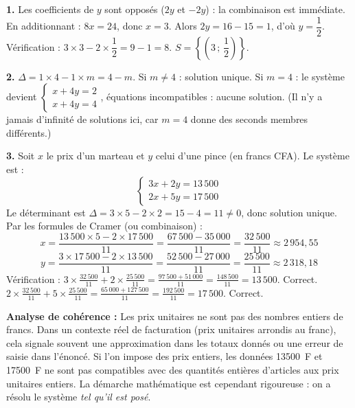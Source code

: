 \documentclass[11pt]{article}
\begin{document}
\begin{corrige}
\textbf{1.} Les coefficients de $y$ sont opposés ($2y$ et $-2y$) : la combinaison est immédiate. En additionnant : $8x = 24$, donc $x = 3$. Alors $2y = 16 - 15 = 1$, d'où $y = \dfrac{1}{2}$. Vérification : $3\times 3 - 2\times \dfrac{1}{2} = 9 - 1 = 8$. $S = \left\{\left(3\,;\,\dfrac{1}{2}\right)\right\}$.

\textbf{2.} $\Delta = 1\times 4 - 1\times m = 4 - m$. Si $m \neq 4$ : solution unique. Si $m = 4$ : le système devient $\begin{cases} x + 4y = 2 \\ x + 4y = 4 \end{cases}$, équations incompatibles : aucune solution. (Il n'y a jamais d'infinité de solutions ici, car $m = 4$ donne des seconds membres différents.)

\textbf{3.} Soit $x$ le prix d'un marteau et $y$ celui d'une pince (en francs CFA). Le système est :
\[ \begin{cases} 3x + 2y = 13\,500 \\ 2x + 5y = 17\,500 \end{cases} \]
Le déterminant est $\Delta = 3\times 5 - 2\times 2 = 15 - 4 = 11 \neq 0$, donc solution unique.
Par les formules de Cramer (ou combinaison) :
\[ x = \frac{13\,500 \times 5 - 2 \times 17\,500}{11} = \frac{67\,500 - 35\,000}{11} = \frac{32\,500}{11} \approx 2\,954,55 \]
\[ y = \frac{3 \times 17\,500 - 2 \times 13\,500}{11} = \frac{52\,500 - 27\,000}{11} = \frac{25\,500}{11} \approx 2\,318,18 \]
Vérification : $3\times \frac{32\,500}{11} + 2\times \frac{25\,500}{11} = \frac{97\,500 + 51\,000}{11} = \frac{148\,500}{11} = 13\,500$. Correct.
$2\times \frac{32\,500}{11} + 5\times \frac{25\,500}{11} = \frac{65\,000 + 127\,500}{11} = \frac{192\,500}{11} = 17\,500$. Correct.

\textbf{Analyse de cohérence :} Les prix unitaires ne sont pas des nombres entiers de francs. Dans un contexte réel de facturation (prix unitaires arrondis au franc), cela signale souvent une approximation dans les totaux donnés ou une erreur de saisie dans l'énoncé. Si l'on impose des prix entiers, les données \SI{13 500}{F} et \SI{17 500}{F} ne sont pas compatibles avec des quantités entières d'articles aux prix unitaires entiers. La démarche mathématique est cependant rigoureuse : on a résolu le système \emph{tel qu'il est posé}.
\end{corrige}
\end{document}

